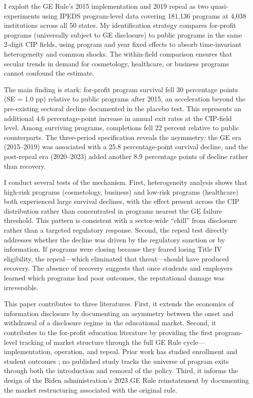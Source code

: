 \documentclass[12pt]{article}
\begin{document}
I exploit the GE Rule's 2015 implementation and 2019 repeal as two quasi-experiments using IPEDS program-level data covering 181,136 programs at 4,038 institutions across all 50 states. My identification strategy compares for-profit programs (universally subject to GE disclosure) to public programs in the same 2-digit CIP fields, using program and year fixed effects to absorb time-invariant heterogeneity and common shocks. The within-field comparison ensures that secular trends in demand for cosmetology, healthcare, or business programs cannot confound the estimate.

The main finding is stark: for-profit program survival fell 30 percentage points (SE = 1.0 pp) relative to public programs after 2015, an acceleration beyond the pre-existing sectoral decline documented in the placebo test. This represents an additional 4.6 percentage-point increase in annual exit rates at the CIP-field level. Among surviving programs, completions fell 22 percent relative to public counterparts. The three-period specification reveals the asymmetry: the GE era (2015--2019) was associated with a 25.8 percentage-point survival decline, and the post-repeal era (2020--2023) added another 8.9 percentage points of decline rather than recovery.

I conduct several tests of the mechanism. First, heterogeneity analysis shows that high-risk programs (cosmetology, business) and low-risk programs (healthcare) both experienced large survival declines, with the effect present across the CIP distribution rather than concentrated in programs nearest the GE failure threshold. This pattern is consistent with a sector-wide ``chill'' from disclosure rather than a targeted regulatory response. Second, the repeal test directly addresses whether the decline was driven by the regulatory sanction or by information. If programs were closing because they feared losing Title IV eligibility, the repeal---which eliminated that threat---should have produced recovery. The absence of recovery suggests that once students and employers learned which programs had poor outcomes, the reputational damage was irreversible.

This paper contributes to three literatures. First, it extends the economics of information disclosure \citep{jin_leslie2003, dranove_kessler_mcclellan_satterthwaite2003, figlio_lucas2004} by documenting an asymmetry between the onset and withdrawal of a disclosure regime in the educational market. Second, it contributes to the for-profit education literature \citep{deming_goldin_katz2012, cellini_goldin2014, deming_yuchtman_abulafi_goldin_katz2016, eaton_howell_yannelis2020} by providing the first program-level tracking of market structure through the full GE Rule cycle---implementation, operation, and repeal. Prior work has studied enrollment and student outcomes \citep{cellini_darolia_turner2020}; no published study tracks the universe of program exits through both the introduction and removal of the policy. Third, it informs the design of the Biden administration's 2023 GE Rule reinstatement by documenting the market restructuring associated with the original rule.
\end{document}

